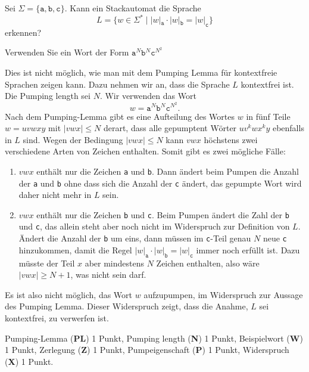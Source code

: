 Sei $\Sigma=\{ \texttt{a}, \texttt{b}, \texttt{c}\}$.
Kann ein Stackautomat die Sprache
\[
L=
\{
w\in\Sigma^*
\;|\;
|w|_{\texttt{a}}
\cdot
|w|_{\texttt{b}}
=
|w|_{\texttt{c}}
\}
\]
erkennen?

\begin{hinweis}
Verwenden Sie ein Wort der Form
$ \texttt{a}^N \texttt{b}^N \texttt{c}^{N^2}$
\end{hinweis}


\begin{loesung}
Dies ist nicht möglich, wie man mit dem Pumping Lemma für kontextfreie
Sprachen zeigen kann.
Dazu nehmen wir an, dass die Sprache $L$ kontextfrei ist.
Die Pumping length sei $N$.
Wir verwenden das Wort
\[
w = \texttt{a}^N\texttt{b}^N\texttt{c}^{N^2}.
\]
Nach dem Pumping-Lemma gibt es eine Aufteilung des Wortes $w$ in fünf
Teile $w=uvwxy$ mit $|vwx| \le N$ derart, dass alle gepumptent
Wörter $uv^kwx^ky$ ebenfalls in $L$ sind.
Wegen der Bedingung $|vwx|\le N$ kann $vwx$ höchstens zwei verschiedene
Arten von Zeichen enthalten.
Somit gibt es zwei mögliche Fälle:
\begin{enumerate}
\item
$vwx$ enthält nur die Zeichen \texttt{a} und \texttt{b}.
Dann ändert beim Pumpen die Anzahl der \texttt{a} und \texttt{b} ohne
dass sich die Anzahl der \texttt{c} ändert, das gepumpte Wort wird daher
nicht mehr in $L$ sein.
\item
$vwx$ enthält nur die Zeichen \texttt{b} und \texttt{c}.
Beim Pumpen ändert die Zahl der \texttt{b} und \texttt{c}, das allein
steht aber noch nicht im Widerspruch zur Definition von $L$.
Ändert die Anzahl der \texttt{b} um eins, dann müssen im \texttt{c}-Teil
genau $N$ neue \texttt{c} hinzukommen, damit die Regel
$
|w|_{\texttt{a}}
\cdot
|w|_{\texttt{b}}
=
|w|_{\texttt{c}}
$
immer noch erfüllt ist.
Dazu müsste der Teil $x$ aber mindestens $N$ Zeichen enthalten, 
also wäre $|vwx|\ge N+1$, was nicht sein darf.
\end{enumerate}
Es ist also nicht möglich, das Wort $w$ aufzupumpen, im Widerspruch
zur Aussage des Pumping Lemma.
Dieser Widerspruch zeigt, dass die Anahme, $L$ sei kontextfrei, zu verwerfen
ist.
\end{loesung}

\begin{bewertung}
Pumping-Lemma ({\bf PL}) 1 Punkt,
Pumping length ({\bf N}) 1 Punkt,
Beispielwort ({\bf W}) 1 Punkt,
Zerlegung ({\bf Z}) 1 Punkt,
Pumpeigenschaft ({\bf P}) 1 Punkt,
Widerspruch ({\bf X}) 1 Punkt.
\end{bewertung}

